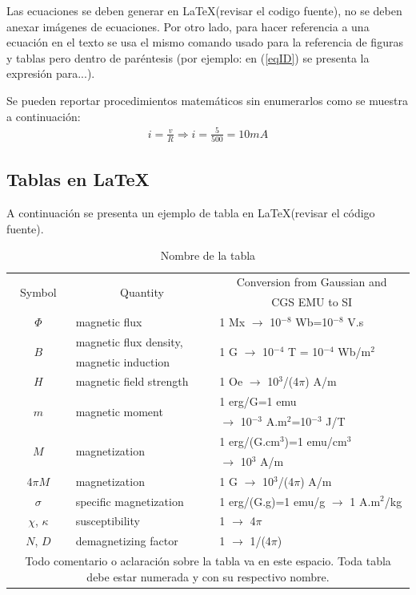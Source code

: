 \documentclass[journal]{IEEEtran}
\begin{document}
Las ecuaciones se deben generar en \LaTeX (revisar el codigo fuente), no se deben anexar imágenes de ecuaciones. Por otro lado, para hacer referencia a una ecuación en el texto  se usa el mismo comando usado para la referencia de figuras y tablas pero dentro de paréntesis (por ejemplo: en (\ref{eqID}) se presenta la expresión para...).

Se pueden reportar procedimientos matemáticos sin enumerarlos como se muestra a continuación:
\begin{gather*}
i=\frac{v}{R}\Longrightarrow i=\frac{5}{500}=10 mA
\end{gather*}

\subsection{Tablas en \LaTeX}
A continuación se presenta un ejemplo de tabla en \LaTeX (revisar el código fuente).

\begin{table}[H]
\makegapedcells
\centering
\caption{Nombre de la tabla}
\begin{tabular}{c l l}\hline\hline
\multirow{2}{*}{Symbol} & \multicolumn{1}{c}{\multirow{2}{*}{Quantity}} & \multicolumn{1}{c}{Conversion from Gaussian and}\\ 
& & \multicolumn{1}{c}{CGS EMU to SI}\\ \hline
$\Phi$ & magnetic flux & 1 Mx $\rightarrow$ 10$^{-8}$ Wb=10$^{-8}$ V.s \\
\multirow{2}{*}{$B$} & magnetic flux density, & \multirow{2}{*}{1 G $\rightarrow$ 10$^{-4}$ T = 10$^{-4}$ Wb/m$^2$}\\
& magnetic induction & \\
$H$ & magnetic field strength & 1 Oe $\rightarrow$ 10$^3$/(4$\pi$) A/m\\
\multirow{2}{*}{$m$} & \multirow{2}{*}{magnetic moment} & 1 erg/G=1 emu \\ 
& & $\rightarrow$ 10$^{-3}$ A.m$^2$=10$^{-3}$ J/T\\
\multirow{2}{*}{$M$} & \multirow{2}{*}{magnetization} & 1 erg/(G.cm$^3$)=1 emu/cm$^3$ \\ 
& & $\rightarrow$ 10$^3$ A/m\\ 
4$\pi M$& magnetization & 1 G $\rightarrow$ 10$^3$/(4$\pi$) A/m \\ 
$\sigma$ & specific magnetization & 1 erg/(G.g)=1 emu/g $\rightarrow$ 1 A.m$^2$/kg\\ 
$\chi$, $\kappa$ & susceptibility & 1 $\rightarrow$ 4$\pi$ \\ 
$N$, $D$ & demagnetizing factor & 1 $\rightarrow$ 1/(4$\pi$)\\ \hline\hline
\multicolumn{3}{p{8.5cm}}{Todo comentario o aclaración sobre la tabla va en este espacio. Toda tabla debe estar numerada y con su respectivo nombre.}\\
\end{tabular}
\label{table1}
\end{table}
\end{document}
